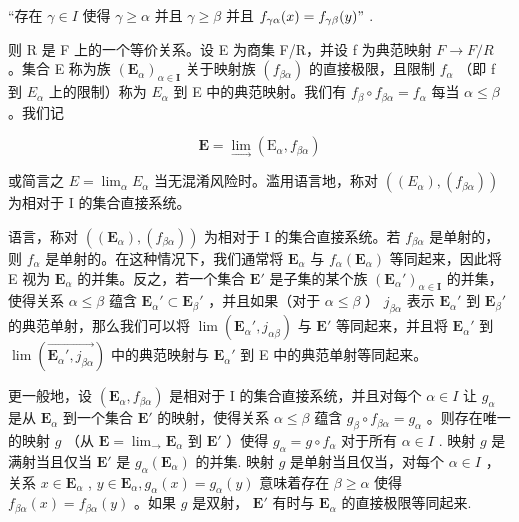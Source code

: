 “存在 \(\gamma \in I\) 使得 \(\gamma \geqslant \alpha\) 并且 \(\gamma \geqslant \beta\) 并且 \(f_{\gamma \alpha}(x) = f_{\gamma \beta}(y) "\) .

则 R 是 F 上的一个等价关系。设 E 为商集 F/R，并设 f 为典范映射 \(F \rightarrow F/R\) 。集合 E 称为族 \((\mathbf{E}_{\alpha})_{\alpha \in \mathbf{I}}\) 关于映射族 \((f_{\beta\alpha})\) 的直接极限，且限制 \(f_{\alpha}\) （即 f 到 \(E_{\alpha}\) 上的限制）称为 \(E_{\alpha}\) 到 E 中的典范映射。我们有 \(f_{\beta} \circ f_{\beta\alpha} = f_{\alpha}\) 每当 \(\alpha \leqslant \beta\) 。我们记

\[
\mathbf {E} = \lim _ {\rightarrow} (\mathrm{E} _ {\alpha}, f _ {\beta \alpha})
\]

或简言之 \(E = \lim_{\alpha} E_{\alpha}\) 当无混淆风险时。滥用语言地，称对 \(((E_{\alpha}), (f_{\beta\alpha}))\) 为相对于 I 的集合直接系统。

语言，称对 \(((\mathbf{E}_{\alpha}), (f_{\beta \alpha}))\) 为相对于 I 的集合直接系统。若 \(f_{\beta \alpha}\) 是单射的，则 \(f_{\alpha}\) 是单射的。在这种情况下，我们通常将 \(\mathbf{E}_{\alpha}\) 与 \(f_{\alpha}(\mathbf{E}_{\alpha})\) 等同起来，因此将 E 视为 \(\mathbf{E}_{\alpha}\) 的并集。反之，若一个集合 \(\mathbf{E}'\) 是子集的某个族 \((\mathbf{E}_{\alpha}')_{\alpha \in \mathbf{I}}\) 的并集，使得关系 \(\alpha \leqslant \beta\) 蕴含 \(\mathbf{E}_{\alpha}' \subset \mathbf{E}_{\beta}'\) ，并且如果（对于 \(\alpha \leqslant \beta\) ） \(j_{\beta \alpha}\) 表示 \(\mathbf{E}_{\alpha}'\) 到 \(\mathbf{E}_{\beta}'\) 的典范单射，那么我们可以将 \(\lim (\mathbf{E}_{\alpha}', j_{\alpha \beta})\) 与 \(\mathbf{E}'\) 等同起来，并且将 \(\mathbf{E}_{\alpha}'\) 到 \(\lim (\overrightarrow{\mathbf{E}_{\alpha}', j_{\beta \alpha}})\) 中的典范映射与 \(\mathbf{E}_{\alpha}'\) 到 E 中的典范单射等同起来。

更一般地，设 \((\mathbf{E}_{\alpha}, f_{\beta \alpha})\) 是相对于 I 的集合直接系统，并且对每个 \(\alpha \in I\) 让 \(g_{\alpha}\) 是从 \(\mathbf{E}_{\alpha}\) 到一个集合 \(\mathbf{E}'\) 的映射，使得关系 \(\alpha \leqslant \beta\) 蕴含 \(g_{\beta} \circ f_{\beta \alpha} = g_{\alpha}\) 。则存在唯一的映射 \(g\) （从 \(\mathbf{E} = \lim_{\rightarrow} \mathbf{E}_{\alpha}\) 到 \(\mathbf{E}'\) ）使得 \(g_{\alpha} = g \circ f_{\alpha}\) 对于所有 \(\alpha \in I\) . 映射 \(g\) 是满射当且仅当 \(\mathbf{E}'\) 是 \(g_{\alpha}(\mathbf{E}_{\alpha})\) 的并集. 映射 \(g\) 是单射当且仅当，对每个 \(\alpha \in I\) ，关系 \(x \in \mathbf{E}_{\alpha}\) , \(y \in \mathbf{E}_{\alpha}, g_{\alpha}(x) = g_{\alpha}(y)\) 意味着存在 \(\beta \geqslant \alpha\) 使得 \(f_{\beta \alpha}(x) = f_{\beta \alpha}(y)\) 。如果 \(g\) 是双射， \(\mathbf{E}'\) 有时与 \(\mathbf{E}_{\alpha}\) 的直接极限等同起来.

